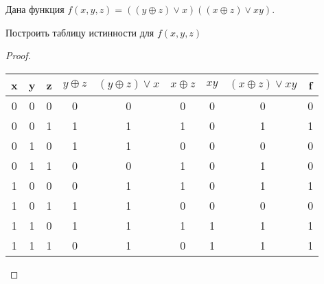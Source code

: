 
\renewcommand*{\proofname}{Решение}
Дана функция $f(x, y, z) = ((y \oplus z) \vee x)((x \oplus z) \vee xy).$
\begin{problem}
Построить таблицу истинности для $f(x, y, z)$
\end{problem}
\begin{proof} $ $\\
    \begin{table}[H]
    \begin{center}
    \begin{tabular}{|c|c|c|c|c|c|c|c|c|}
    \hline
    x & y & z & $y \oplus z$ & $(y \oplus z) \vee x$ & $x \oplus z$ & $xy$ & $(x \oplus z) \vee xy$ & f \\
    \hline
    0 & 0 & 0   & 0 & 0 & 0 & 0 & 0 & 0\\
    0 & 0 & 1   & 1 & 1 & 1 & 0 & 1 & 1\\
    0 & 1 & 0   & 1 & 1 & 0 & 0 & 0 & 0\\
    0 & 1 & 1   & 0 & 0 & 1 & 0 & 1 & 0\\
    1 & 0 & 0   & 0 & 1 & 1 & 0 & 1 & 1\\
    1 & 0 & 1   & 1 & 1 & 0 & 0 & 0 & 0\\
    1 & 1 & 0   & 1 & 1 & 1 & 1 & 1 & 1\\
    1 & 1 & 1   & 0 & 1 & 0 & 1 & 1 & 1\\
    \hline
    \end{tabular}
    \end{center}
    \end{table} 
\end{proof}

